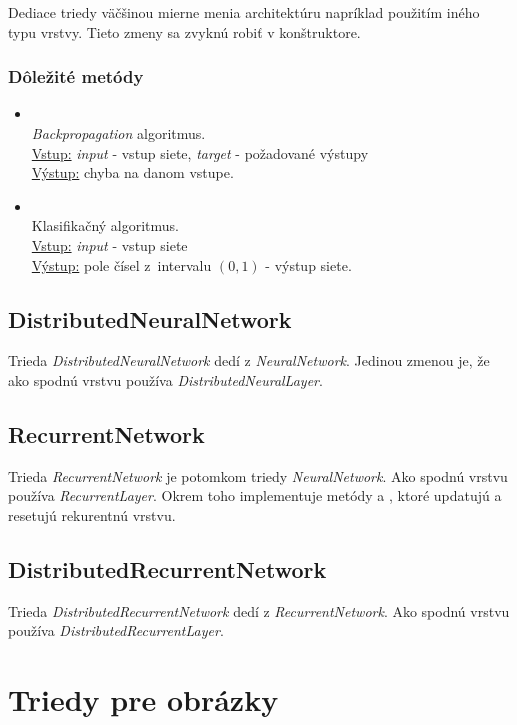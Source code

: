Dediace triedy väčšinou mierne menia architektúru napríklad použitím iného typu vrstvy. Tieto zmeny sa zvyknú robiť v konštruktore.

\subsubsection{Dôležité metódy}
\begin{itemize}
\item {}
\\\textit{Backpropagation} algoritmus.
\\ \underline{Vstup:} \textit{input} - vstup siete, \textit{target} - požadované výstupy 
\\ \underline{Výstup:} chyba na danom vstupe.
\item {}
\\ Klasifikačný algoritmus.
\\ \underline{Vstup:} \textit{input} - vstup siete
\\ \underline{Výstup:} pole čísel z~intervalu $(0,1)$ - výstup siete.
\end{itemize}

\subsection{DistributedNeuralNetwork}
Trieda \textit{DistributedNeuralNetwork} dedí z \textit{NeuralNetwork}. Jedinou zmenou je, že ako spodnú vrstvu používa \textit{DistributedNeuralLayer}.

\subsection{RecurrentNetwork}
Trieda \textit{RecurrentNetwork} je potomkom triedy \textit{NeuralNetwork}. Ako spodnú vrstvu používa \textit{RecurrentLayer}. Okrem toho implementuje metódy  a , ktoré updatujú a resetujú rekurentnú vrstvu.

\subsection{DistributedRecurrentNetwork}
Trieda \textit{DistributedRecurrentNetwork} dedí z \textit{RecurrentNetwork}. Ako spodnú vrstvu používa \textit{DistributedRecurrentLayer}.

\section{Triedy pre obrázky}

